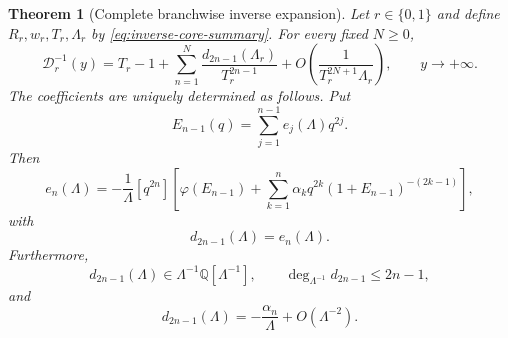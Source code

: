 \documentclass[11pt,a4paper,oneside]{article}
\theoremstyle{plain}
\newtheorem{theorem}{Theorem}[section]
\theoremstyle{definition}
\theoremstyle{remark}
\newcommand{\Q}{\mathbb Q}
\newcommand{\coeff}[2]{\left[#1^{#2}\right]}
\newcommand{\D}{\mathcal D}
\begin{document}
\begin{theorem}[Complete branchwise inverse expansion]
\label{thm:branch-inverse}
Let $r\in\{0,1\}$ and define $R_r,w_r,T_r,\Lambda_r$ by
\cref{eq:inverse-core-summary}.  For every fixed $N\ge0$,
\begin{equation}
 \D_r^{-1}(y)
 =T_r-1+\sum_{n=1}^{N}
 \frac{d_{2n-1}(\Lambda_r)}{T_r^{2n-1}}
 +O\!\left(\frac{1}{T_r^{2N+1}\Lambda_r}\right),
 \qquad y\to+\infty.
 \label{eq:branch-inverse-all-orders}
\end{equation}
The coefficients are uniquely determined as follows.  Put
\begin{equation}
 E_{n-1}(q)=\sum_{j=1}^{n-1}e_j(\Lambda)q^{2j}.
 \label{eq:E-truncated}
\end{equation}
Then
\begin{equation}
 e_n(\Lambda)=-\frac1\Lambda\coeff{q}{2n}
 \left[
  \varphi(E_{n-1})+
  \sum_{k=1}^{n}\alpha_kq^{2k}
       (1+E_{n-1})^{-(2k-1)}
 \right],
 \label{eq:inverse-triangular-recurrence}
\end{equation}
with
\begin{equation}
 d_{2n-1}(\Lambda)=e_n(\Lambda).
 \label{eq:d-e-identification}
\end{equation}
Furthermore,
\begin{equation}
 d_{2n-1}(\Lambda)\in\Lambda^{-1}\Q[\Lambda^{-1}],
 \qquad
 \deg_{\Lambda^{-1}}d_{2n-1}\le2n-1,
 \label{eq:d-ring-degree}
\end{equation}
and
\begin{equation}
 d_{2n-1}(\Lambda)=-\frac{\alpha_n}{\Lambda}
 +O(\Lambda^{-2}).
 \label{eq:d-leading-slope}
\end{equation}
\end{theorem}
\end{document}
